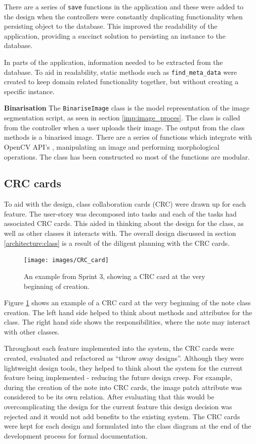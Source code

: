 There are a series of \texttt{save} functions in the application and these were added to the design when the controllers were constantly duplicating functionality when persisting object to the database. This improved the readability of the application, providing a succinct solution to persisting an instance to the database.

In parts of the application, information needed to be extracted from the database. To aid in readability, static methods such as \texttt{find\_meta\_data} were created to keep domain related functionality together, but without creating a specific instance.

\noindent
\textbf{Binarisation}
\newline
The \texttt{BinariseImage} class is the model representation of the image segmentation script, as seen in section \ref{imp:image_proces}. The class is called from the controller when a user uploads their image. The output from the class methods is a binarised image. There are a series of functions which integrate with OpenCV API's \cite{citeulike:13206865}, manipulating an image and performing morphological operations. The class has been constructed so most of the functions are modular.

\subsection{CRC cards} \label{design:CRC}
To aid with the design, class collaboration cards (CRC) were drawn up for each feature. The user-story was decomposed into tasks and each of the tasks had associated CRC cards. This aided in thinking about the design for the class, as well as other classes it interacts with.  The overall design discussed in section \ref{architecture:class} is a result of the diligent planning with the CRC cards.

\begin{figure}[H]
  \centering
  \texttt{[image: images/CRC\_card]}
  \caption{An example from Sprint 3, showing a CRC card at the very beginning of creation.}
  \label{fig:crc1}
\end{figure}

Figure \ref{fig:crc1} shows an example of a CRC card at the very beginning of the note class creation. The left hand side helped to think about methods and attributes for the class. The right hand side shows the responsibilities, where the note may interact with other classes.

Throughout each feature implemented into the system, the CRC cards were created, evaluated and refactored as ``throw away designs''. Although they were lightweight design tools, they helped to think about the system for the current feature being implemented - reducing the future design creep. For example, during the creation of the note into CRC cards, the image patch attribute was considered to be its own relation. After evaluating that this would be overcomplicating the design for the current feature this design decision was rejected and it would not add benefits to the existing system. The CRC cards were kept for each design and formulated into the class diagram at the end of the development process for formal documentation.

